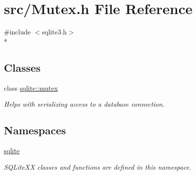 \hypertarget{a00027}{\section{src/\-Mutex.h File Reference}
\label{a00027}
}
{\ttfamily \#include $<$sqlite3.\-h$>$}\\*
\subsection*{Classes}
\begin{DoxyCompactItemize}
\item 
class \hyperlink{a00009}{sqlite\-::mutex}
\begin{DoxyCompactList}\small\item\em Helps with serializing access to a database connection. \end{DoxyCompactList}\end{DoxyCompactItemize}
\subsection*{Namespaces}
\begin{DoxyCompactItemize}
\item 
\hyperlink{a00038}{sqlite}
\begin{DoxyCompactList}\small\item\em S\-Q\-Lite\-X\-X classes and functions are defined in this namespace. \end{DoxyCompactList}\end{DoxyCompactItemize}
